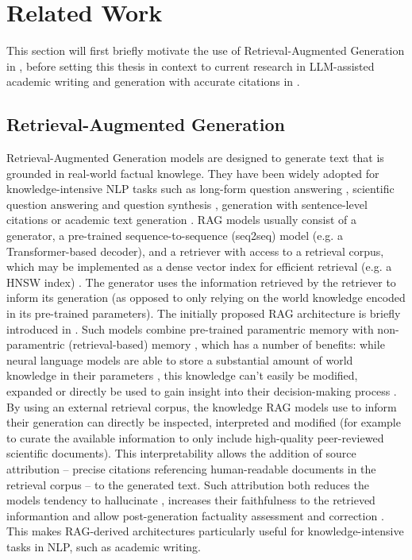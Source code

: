 \chapter{Related Work}\label{related-work}
This section will first briefly motivate the use of Retrieval-Augmented Generation in , before setting this thesis in context to current research in LLM-assisted academic writing and generation with accurate citations in . %


\section{Retrieval-Augmented Generation}\label{rag-intro}
Retrieval-Augmented Generation \cite{lewis2020retrieval} models are designed to generate text that is grounded in real-world factual knowlege. They have been widely adopted for knowledge-intensive NLP tasks \cite{shao2025reasonir} such as long-form question answering \cite{xia2024ground}, scientific question answering \cite{lala2023paperqa} and question synthesis \cite{xu2024kiwi}, generation with sentence-level citations \cite{zhang2024longcite, xia2024ground} or academic text generation \cite{asai2024openscholar, wang2025scholarcopilot}. RAG models usually consist of a generator, a pre-trained sequence-to-sequence (seq2seq) model (e.g. a Transformer-based \cite{vaswani2017attention} decoder), and a retriever with access to a retrieval corpus, which may be implemented as a dense vector index for efficient retrieval (e.g. a HNSW \cite{malkov2018efficient} index) \cite{lewis2020retrieval}. The generator uses the information retrieved by the retriever to inform its generation (as opposed to only relying on the world knowledge encoded in its pre-trained parameters). The initially proposed RAG architecture is briefly introduced in . Such models combine pre-trained paramentric memory with non-paramentric (retrieval-based) memory \cite{lewis2020retrieval}, which has a number of benefits: while neural language models are able to store a substantial amount of world knowledge in their parameters \cite{roberts2020much}, this knowledge can't easily be modified, expanded or directly be used to gain insight into their decision-making process \cite{lewis2019bart}. By using an external retrieval corpus, the knowledge RAG models use to inform their generation can directly be inspected, interpreted \cite{lewis2020retrieval} and modified (for example to curate the available information to only include high-quality peer-reviewed scientific documents). This interpretability allows the addition of source attribution -- precise citations referencing human-readable documents in the retrieval corpus -- to the generated text. Such attribution both reduces the models tendency to hallucinate \cite{saxena2024attribution,qian2024capacity}, increases their faithfulness to the retrieved informantion \cite{zhang2024longcite} and allow post-generation factuality assessment and correction \cite{slobodkin2024attribute}. This makes RAG-derived architectures particularly useful for knowledge-intensive tasks in NLP, such as academic writing.


